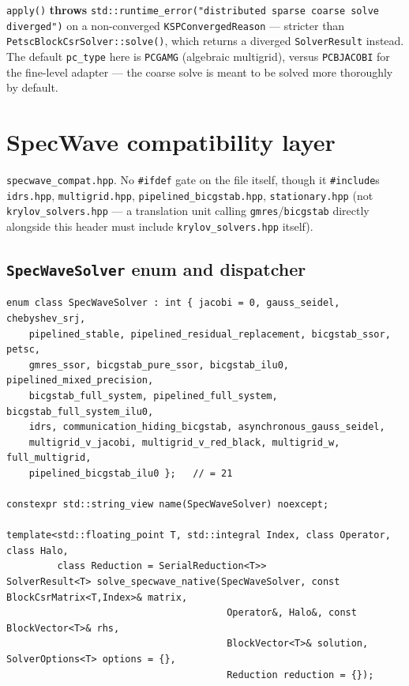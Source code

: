 \documentclass[11pt,a4paper]{report}
\begin{document}
\lstinline!apply()! \textbf{throws} \lstinline!std::runtime_error("distributed sparse coarse solve diverged")!
on a non-converged \lstinline!KSPConvergedReason! --- stricter than
\lstinline!PetscBlockCsrSolver::solve()!, which returns a diverged
\lstinline!SolverResult! instead. The default \lstinline!pc_type! here is
\lstinline!PCGAMG! (algebraic multigrid), versus \lstinline!PCBJACOBI! for the
fine-level adapter --- the coarse solve is meant to be solved more
thoroughly by default.

\chapter{SpecWave compatibility layer}
\label{sec:10}

\texttt{specwave\_compat.hpp}. No \lstinline!#ifdef! gate on the file itself,
though it \lstinline!#include!s \texttt{idrs.hpp}, \texttt{multigrid.hpp},
\texttt{pipelined\_bicgstab.hpp}, \texttt{stationary.hpp} (not
\texttt{krylov\_solvers.hpp} --- a translation unit calling
\lstinline!gmres!/\lstinline!bicgstab! directly alongside this header must
include \texttt{krylov\_solvers.hpp} itself).

\section{\texorpdfstring{\lstinline!SpecWaveSolver! enum and dispatcher}{SpecWaveSolver enum and dispatcher}}
\label{sec:10.1}

\begin{lstlisting}
enum class SpecWaveSolver : int { jacobi = 0, gauss_seidel, chebyshev_srj,
    pipelined_stable, pipelined_residual_replacement, bicgstab_ssor, petsc,
    gmres_ssor, bicgstab_pure_ssor, bicgstab_ilu0, pipelined_mixed_precision,
    bicgstab_full_system, pipelined_full_system, bicgstab_full_system_ilu0,
    idrs, communication_hiding_bicgstab, asynchronous_gauss_seidel,
    multigrid_v_jacobi, multigrid_v_red_black, multigrid_w, full_multigrid,
    pipelined_bicgstab_ilu0 };   // = 21

constexpr std::string_view name(SpecWaveSolver) noexcept;

template<std::floating_point T, std::integral Index, class Operator, class Halo,
         class Reduction = SerialReduction<T>>
SolverResult<T> solve_specwave_native(SpecWaveSolver, const BlockCsrMatrix<T,Index>& matrix,
                                       Operator&, Halo&, const BlockVector<T>& rhs,
                                       BlockVector<T>& solution, SolverOptions<T> options = {},
                                       Reduction reduction = {});
\end{lstlisting}
\end{document}
